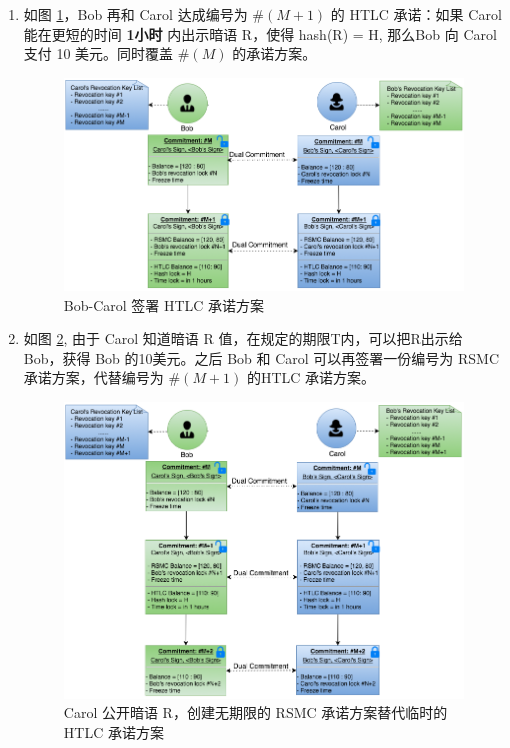 \begin{enumerate}
    \item 如图 \ref{fig:htlc_bob_carol_2}，Bob 再和 Carol 达成编号为 $\#(M+1)$ 的 HTLC 承诺：如果 Carol 能在更短的时间 \textbf{1小时} 内出示暗语 R，使得 hash(R) = H, 那么Bob 向 Carol 支付 10 美元。同时覆盖 $\#(M)$ 的承诺方案。
        \begin{figure}[h!]
            \centering
            \includegraphics[width=12cm, keepaspectratio]{../images/bob_carol_2.png}
            \caption{Bob-Carol 签署 HTLC 承诺方案}
            \label{fig:htlc_bob_carol_2}
        \end{figure}

    \item 如图 \ref{fig:htlc_bob_carol_3}, 由于 Carol 知道暗语 R 值，在规定的期限T内，可以把R出示给 Bob，获得 Bob 的10美元。之后 Bob 和 Carol 可以再签署一份编号为  RSMC 承诺方案，代替编号为 $\#(M+1)$ 的HTLC 承诺方案。

        \begin{figure}[h!]
            \centering
            \includegraphics[width=12cm, keepaspectratio]{../images/bob_carol_3.png}
            \caption{Carol 公开暗语 R，创建无期限的 RSMC 承诺方案替代临时的 HTLC 承诺方案}
            \label{fig:htlc_bob_carol_3}
        \end{figure}


\end{enumerate}

